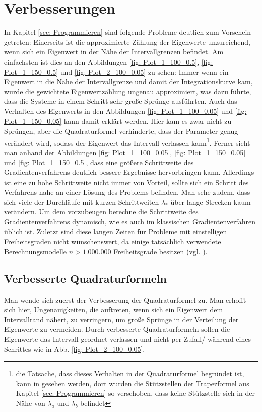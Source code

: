 \documentclass[a4paper,12pt]{report}
\newcommand{\1}{\mathds{1}}
\theoremstyle{plain} %
\theoremstyle{definition} %
\theoremstyle{remark}
\begin{document}
\chapter{Verbesserungen}
\label{sec: Verbesserungen}
      In Kapitel \ref{sec: Programmieren} sind folgende Probleme deutlich zum Vorschein getreten:
      Einerseits ist die approximierte Zählung der Eigenwerte unzureichend, wenn sich ein Eigenwert in der Nähe der Intervallgrenzen befindet.
      Am einfachsten ist dies an den Abbildungen \ref{fig: Plot_1_100_0.5}, \ref{fig: Plot_1_150_0.5} und \ref{fig: Plot_2_100_0.05} zu sehen:
      Immer wenn ein Eigenwert in die Nähe der Intervallgrenze und damit der Integrationskurve kam,
      wurde die gewichtete Eigenwertzählung ungenau approximiert, was dazu führte, dass die Systeme in einem Schritt sehr große Sprünge ausführten.
      Auch das Verhalten des Eigenwerts in den Abbildungen \ref{fig: Plot_1_100_0.05} und \ref{fig: Plot_1_150_0.05} kann damit erklärt werden.
      Hier kam es zwar nicht zu Sprüngen, aber die Quadraturformel verhinderte, dass der Parameter \s genug verändert wird,
      sodass der Eigenwert das Intervall verlassen kann\footnote{die Tatsache, dass dieses Verhalten in der Quadraturformel begründet ist,
      kann in \mbox{\cite[\textit{./Verbesserung\_Trapez.py}]{github}} gesehen werden, dort wurden die Stützstellen der Trapezformel aus Kapitel \ref{sec: Programmieren} so verschoben, dass keine Stützstelle sich in der Nähe von $\lambda_a$ und $\lambda_b$ befindet}.
      Ferner sieht man anhand der Abbildungen \ref{fig: Plot_1_100_0.05}, \ref{fig: Plot_1_150_0.05} und \ref{fig: Plot_1_150_0.5},
      dass eine größere Schrittweite des Gradientenverfahrens deutlich bessere Ergebnisse hervorbringen kann.
      Allerdings ist eine zu hohe Schrittweite nicht immer von Vorteil, sollte sich ein Schritt des Verfahrens nahe an einer Lösung des Problems befinden.
      Man sehe zudem, dass sich viele der Durchläufe mit kurzen Schrittweiten $\lambda_*$ über lange Strecken kaum verändern.
      Um dem vorzubeugen berechne die Schrittweite des Gradientenverfahrens dynamisch, wie es auch im klassischen Gradientenverfahren \cite[S. 285 f.]{optimierungBurkhard} üblich ist.
      Zuletzt sind diese langen Zeiten für Probleme mit einstelligen Freiheitsgraden nicht wünschenswert,
      da einige tatsächlich verwendete Berechnungsmodelle $n>1.000.000$ Freiheitsgrade besitzen (vgl. \cite[S. 359]{maschinendynamikDresig}).

      \section{Verbesserte Quadraturformeln}
            Man wende sich zuerst der Verbesserung der Quadraturformel zu.
            Man erhofft sich hier, Ungenauigkeiten, die auftreten, wenn sich ein Eigenwert dem Intervallrand nähert, zu verringern, um große Sprünge in der Verteilung der Eigenwerte zu vermeiden.
            Durch verbesserte Quadraturformeln sollen die Eigenwerte das Intervall geordnet verlassen und nicht per Zufall/ während eines Schrittes wie in Abb. \ref{fig: Plot_2_100_0.05}.
\end{document}
